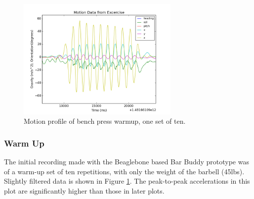 \documentclass[11pt,oneside]{amsart}
\begin{document}
\begin{figure}[htbp]
\begin{center}
\includegraphics[width=0.7\textwidth]{figures/warmup.png}
\caption{Motion profile of bench press warmup, one set of ten.}
\label{fig:warmup}
\end{center}
\end{figure}

\subsubsection{Warm Up}
The initial recording made with the Beaglebone based Bar Buddy prototype was of a warm-up set of ten repetitions, with only the weight of the barbell (45lbs). Slightly filtered data is shown in Figure \ref{fig:warmup}. The peak-to-peak accelerations in this plot are significantly higher than those in later plots. 
\end{document}
